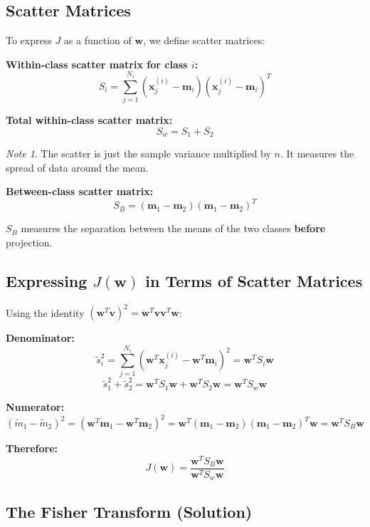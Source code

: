 \documentclass[11pt,a4paper]{article}
\theoremstyle{definition}
\theoremstyle{plain}
\theoremstyle{remark}
\newtheorem*{remark}{Note}
\begin{document}
\subsection{Scatter Matrices}

To express $J$ as a function of $\mathbf{w}$, we define scatter matrices:

\textbf{Within-class scatter matrix for class $i$:}
\[
S_i = \sum_{j=1}^{N_i} \left( \mathbf{x}_j^{(i)} - \mathbf{m}_i \right)\left( \mathbf{x}_j^{(i)} - \mathbf{m}_i \right)^T
\]

\textbf{Total within-class scatter matrix:}
\[
S_w = S_1 + S_2
\]

\begin{remark}
The scatter is just the sample variance multiplied by $n$. It measures the spread of data around the mean.
\end{remark}

\textbf{Between-class scatter matrix:}
\[
S_B = (\mathbf{m}_1 - \mathbf{m}_2)(\mathbf{m}_1 - \mathbf{m}_2)^T
\]

$S_B$ measures the separation between the means of the two classes \textbf{before} projection.

\subsection{Expressing $J(\mathbf{w})$ in Terms of Scatter Matrices}

Using the identity $({\mathbf{w}^T \mathbf{v}})^2 = \mathbf{w}^T \mathbf{v} \mathbf{v}^T \mathbf{w}$:

\textbf{Denominator:}
\[
\tilde{s}_i^2 = \sum_{j=1}^{N_i} \left( \mathbf{w}^T \mathbf{x}_j^{(i)} - \mathbf{w}^T \mathbf{m}_i \right)^2 = \mathbf{w}^T S_i \mathbf{w}
\]
\[
\tilde{s}_1^2 + \tilde{s}_2^2 = \mathbf{w}^T S_1 \mathbf{w} + \mathbf{w}^T S_2 \mathbf{w} = \mathbf{w}^T S_w \mathbf{w}
\]

\textbf{Numerator:}
\[
(\tilde{m}_1 - \tilde{m}_2)^2 = (\mathbf{w}^T \mathbf{m}_1 - \mathbf{w}^T \mathbf{m}_2)^2 = \mathbf{w}^T (\mathbf{m}_1 - \mathbf{m}_2)(\mathbf{m}_1 - \mathbf{m}_2)^T \mathbf{w} = \mathbf{w}^T S_B \mathbf{w}
\]

\textbf{Therefore:}
\[
\boxed{J(\mathbf{w}) = \frac{\mathbf{w}^T S_B \mathbf{w}}{\mathbf{w}^T S_w \mathbf{w}}}
\]

\subsection{The Fisher Transform (Solution)}
\end{document}
